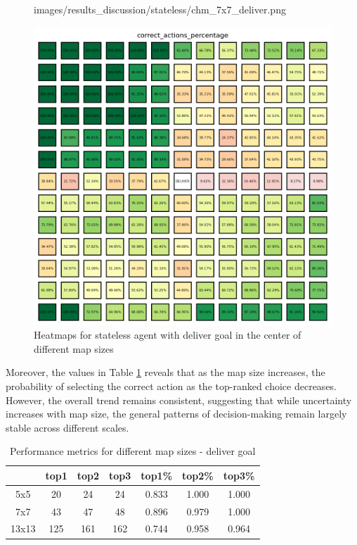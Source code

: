 \begin{figure}[h!]
\begin{minipage}[b]{0.32\textwidth}
{      images/results_discussion/stateless/chm_7x7_deliver.png
    }
    \caption{7x7}
    \label{fig:chm_7x7_deliver}
  \end{minipage}
  \hfill
  \begin{minipage}[b]{0.32\textwidth}
    \centering
    \includegraphics[width=\textwidth]{
      images/results_discussion/stateless/chm_13x13_deliver.png
    }
    \caption{13x13}
    \label{fig:chm_13x13_deliver}
  \end{minipage}
  \caption{Heatmaps for stateless agent with deliver goal in the center of
  different map sizes}
  \label{fig:stateless_deliver_correctness}
\end{figure}
\vspace{5mm}

Moreover, the values in Table \ref{tab:performance} reveals that as the map size
increases, the probability of selecting the correct action as the top-ranked
choice decreases. However, the overall trend remains consistent, suggesting that
while uncertainty increases with map size, the general patterns of decision-making
remain largely stable across different scales.

\vspace{5mm}
\begin{table}[h!]
  \centering
  \begin{tabular}{c|ccc|ccc}
          & top1 & top2 & top3 & top1\% & top2\% & top3\% \\
    \hline
    5x5   & 20   & 24   & 24   & 0.833  & 1.000  & 1.000  \\
    7x7   & 43   & 47   & 48   & 0.896  & 0.979  & 1.000  \\
    13x13 & 125  & 161  & 162  & 0.744  & 0.958  & 0.964  \\
  \end{tabular}
  \caption{Performance metrics for different map sizes - deliver goal}
  \label{tab:performance}
\end{table}
\vspace{5mm}

